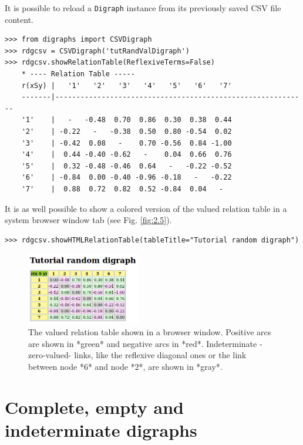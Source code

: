 It is possible to reload a \texttt{Digraph} instance from its previously saved CSV file content.
\begin{lstlisting} 
>>> from digraphs import CSVDigraph   
>>> rdgcsv = CSVDigraph('tutRandValDigraph')
>>> rdgcsv.showRelationTable(ReflexiveTerms=False)
    * ---- Relation Table -----
    r(xSy) |   '1'   '2'   '3'   '4'   '5'   '6'   '7'	  
    -------|------------------------------------------------------------
    '1'    |   -   -0.48  0.70  0.86  0.30  0.38  0.44	 
    '2'    | -0.22   -   -0.38  0.50  0.80 -0.54  0.02	 
    '3'    | -0.42  0.08   -    0.70 -0.56  0.84 -1.00	 
    '4'    |  0.44 -0.40 -0.62   -    0.04  0.66  0.76	 
    '5'    |  0.32 -0.48 -0.46  0.64   -   -0.22 -0.52	 
    '6'    | -0.84  0.00 -0.40 -0.96 -0.18   -   -0.22	 
    '7'    |  0.88  0.72  0.82  0.52 -0.84  0.04   -
\end{lstlisting}
  
It is as well possible to show a colored version of the valued relation table in a system browser window tab (see Fig. \ref{fig:2.5}).
\begin{lstlisting}
>>> rdgcsv.showHTMLRelationTable(tableTitle="Tutorial random digraph")
\end{lstlisting}
 \begin{figure}[h]
\sidecaption
\includegraphics[width=5cm]{Figures/htmlTutorialDigraph.png}
\caption{The valued relation table shown in a browser window. Positive arcs are shown in *green* and negative arcs in *red*. Indeterminate -zero-valued- links, like the reflexive diagonal ones or the link between node *6* and node *2*, are shown in *gray*.}
\label{fig:2.6}       %
\end{figure}
 
\section{Complete, empty and indeterminate digraphs}
\label{sec:2.10}

